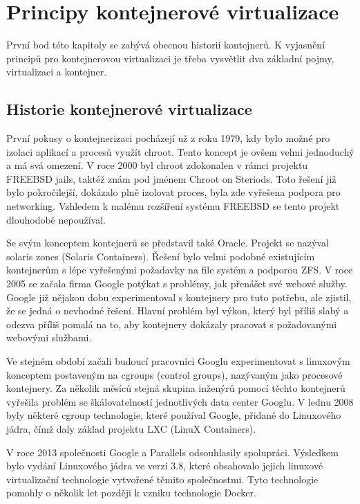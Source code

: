 \chapter{Principy kontejnerové virtualizace} \label{chp:kontejner}
První bod této kapitoly se zabývá obecnou historií kontejnerů. K vyjasnění principů pro kontejnerovou virtualizaci je třeba vysvětlit dva základní pojmy, virtualizaci a kontejner.

\section{Historie kontejnerové virtualizace}
První pokusy o kontejnerizaci pocházejí už z roku 1979, kdy bylo možné pro izolaci aplikací a procesů využít chroot. Tento koncept je ovšem velmi jednoduchý a má svá omezení.
V roce 2000 byl chroot zdokonalen v rámci projektu FREEBSD jails\cite{chroot}, taktéž znám pod jménem Chroot on Steriods\cite{chroot}. Toto řešení již bylo pokročilejší, dokázalo plně izolovat proces, byla zde vyřešena podpora pro networking. Vzhledem k malému rozšíření systému FREEBSD se tento projekt dlouhodobě nepoužíval.

Se svým konceptem kontejnerů se představil také Oracle. Projekt se nazýval solaris zones\cite{solaris_zone} (Solaris Containers). Řešení bylo velmi podobné existujícím kontejnerům s lépe vyřešenými požadavky na file systém a podporou ZFS.
V roce 2005 se začala firma Google potýkat s problémy, jak přenášet své webové služby. Google již nějakou  dobu experimentoval s kontejnery pro tuto potřebu, ale zjistil, že se jedná o nevhodné řešení. Hlavní problém byl výkon, který byl příliš slabý a odezva příliš pomalá na to, aby kontejnery dokázaly pracovat s požadovanými webovými službami.

Ve stejném období začali budoucí pracovníci Googlu experimentovat s linuxovým konceptem postaveným na cgroups (control groups), nazývaným jako procesové kontejnery. Za několik měsíců stejná skupina inženýrů pomocí těchto kontejnerů vyřešila problém se škálovatelností jednotlivých data center Googlu. 
V lednu 2008 byly některé cgroup technologie, které používal Google, přidané do Linuxového jádra, čímž daly základ projektu LXC (LinuX Containers).

V roce 2013 společnosti Google a Parallels odsouhlasily spolupráci. Výsledkem bylo vydání Linuxového jádra ve verzi 3.8\cite{gp_38}, které obsahovalo jejich linuxové virtualizační technologie vytvořené těmito společnostmi. Tyto technologie pomohly o několik let později k vzniku technologie Docker.

